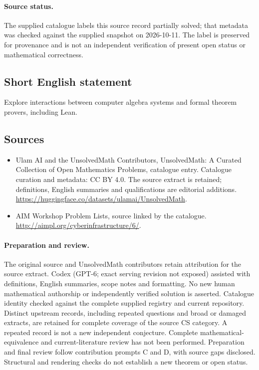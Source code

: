 \documentclass[11pt]{article}
\begin{document}
\paragraph{Source status.}
The supplied catalogue labels this source record partially solved; that metadata was checked against the supplied snapshot on 2026-10-11. The label is preserved for provenance and is not an independent verification of present open status or mathematical correctness.
\subsection{Short English statement}
Explore interactions between computer algebra systems and formal theorem provers, including Lean.
\subsection{Sources}
\begin{itemize}
\item[\hypertarget{source:statement:1}{S1}] Ulam AI and the UnsolvedMath Contributors, UnsolvedMath: A Curated Collection of Open Mathematics Problems, catalogue entry. Catalogue curation and metadata: CC BY 4.0. The source extract is retained; definitions, English summaries and qualifications are editorial additions.
\url{https://huggingface.co/datasets/ulamai/UnsolvedMath}.
\item[\hypertarget{source:statement:2}{S2}] AIM Workshop Problem Lists, source linked by the catalogue.
\url{http://aimpl.org/cyberinfrastructure/6/}.
\end{itemize}
\paragraph{Preparation and review.}
The original source and UnsolvedMath contributors retain attribution for the source extract. Codex (GPT-6; exact serving revision not exposed) assisted with definitions, English summaries, scope notes and formatting. No new human mathematical authorship or independently verified solution is asserted. Catalogue identity checked against the complete supplied registry and current repository. Distinct upstream records, including repeated questions and broad or damaged extracts, are retained for complete coverage of the source CS category. A repeated record is not a new independent conjecture. Complete mathematical-equivalence and current-literature review has not been performed. Preparation and final review follow contribution prompts C and D, with source gaps disclosed. Structural and rendering checks do not establish a new theorem or open status.
\label{end:statement}
\end{document}
